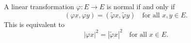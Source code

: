 A linear transformation $\varphi: E \rightarrow E$ is normal if and only if
$$(\varphi x, \varphi y) = (\tilde{\varphi} x, \tilde{\varphi} y) \quad \text{for all } x, y \in E.$$
This is equivalent to
$$|\varphi x|^2 = |\tilde{\varphi} x|^2 \quad \text{for all } x \in E.$$
